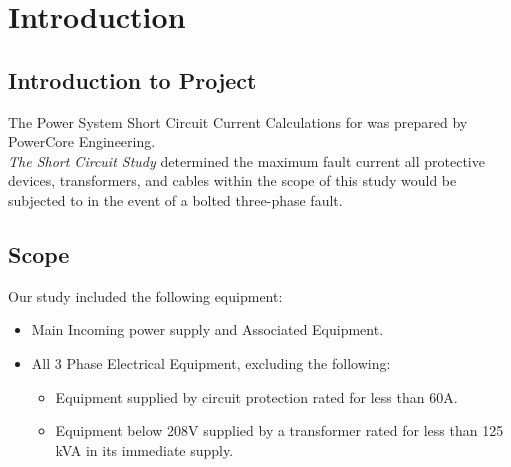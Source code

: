 
\section{Introduction}
\label{af:intro}

\subsection{Introduction to Project}
\label{af:intro:proj}

\noindent The Power System Short Circuit Current Calculations for \Customer{} was prepared by PowerCore Engineering.\\

\noindent \emph{The Short Circuit Study} determined the maximum fault current all protective devices, transformers, and cables within the scope of this study would be
subjected to in the event of a bolted three-phase fault.\\


\subsection{Scope}
\label{af:intro:scope}

Our study included the following equipment:
\begin{itemize}
	\item Main Incoming power supply and Associated Equipment.
	\item All 3 Phase Electrical Equipment, excluding the following:
	\begin{itemize}
		\item Equipment supplied by circuit protection rated for less than 60A. 
		\item Equipment below 208V supplied by a transformer rated for less than 125 kVA in its immediate supply.
	\end{itemize}
\end{itemize}


